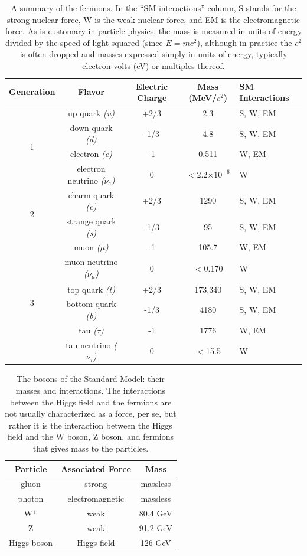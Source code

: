 \begin{table}
	\caption{A summary of the fermions.  In the ``SM interactions'' column, 
    S stands for the strong nuclear force, W is the weak nuclear force, 
    and EM is the electromagnetic force.  As is customary in particle physics, 
    the mass is measured in units of energy divided by the speed of light squared 
    (since $E=mc^2$), although in practice the $c^2$ is often 
    dropped and masses expressed simply in units of energy, typically electron-volts (eV) or multiples thereof\cite{PDG-Review}. 	\label{tab:QLTable}}
	\begin{tabular}{| c || c | c | c | p{2cm} |}
		\hline
		Generation &  Flavor & Electric Charge & Mass (MeV/$c^2$) & SM Interactions\\
		\hline
		\multirow{4}{*}{1} & up quark \it{(u)} & +2/3 & 2.3 & S, W, EM\\
		    & down quark \it{(d)} & -1/3 & 4.8 & S, W, EM\\
		    & electron \it{(e)}& -1 & 0.511 & W, EM \\
		    & electron neutrino \it{($\nu_{e}$)} & 0 & $<$2.2$\times 10^{-6}$ & W\\
		\hline
		\multirow{2}{*}{2} & charm quark \it{(c)} & +2/3 & 1290 &  S, W, EM \\
		    & strange quark \it{(s)} & -1/3 & 95 & S, W, EM \\
		    & muon \it{($\mu$)} & -1& 105.7 & W, EM \\
		    & muon neutrino \it{($\nu_{\mu}$)} & 0 & $<$0.170 & W \\
		\hline 
		\multirow{2}{*}{3} & top quark \it{(t)} & +2/3 & 173,340 & S, W, EM \\
		    & bottom quark \it{(b)} & -1/3  & 4180 & S, W, EM \\ 
		    & tau \it{($\tau$)} & -1 & 1776 & W, EM\\
		    & tau neutrino \it{($\nu_{\tau}$)} & 0 & $<$15.5 & W\\		    
		\hline
	\end{tabular}
\end{table}


\begin{table}
	\caption{The bosons of the Standard Model: their masses and interactions.   
    The interactions between the Higgs field and the fermions are not usually characterized as 
    a force, per se, but rather it is the interaction between the 
    Higgs field and the W boson, Z boson, and fermions that gives mass to the particles.  \label{tab:boson_table}}
    \center
	\begin{tabular}{| c || c | c |}
	\hline
	Particle & Associated Force & Mass \\
	\hline
	gluon & strong & massless \\
	photon & electromagnetic & massless \\
	W$^\pm$ & weak & 80.4 GeV \\
	Z & weak & 91.2 GeV \\ 
	Higgs boson & Higgs field & 126 GeV \\
	\hline
	\end{tabular}
\end{table}


